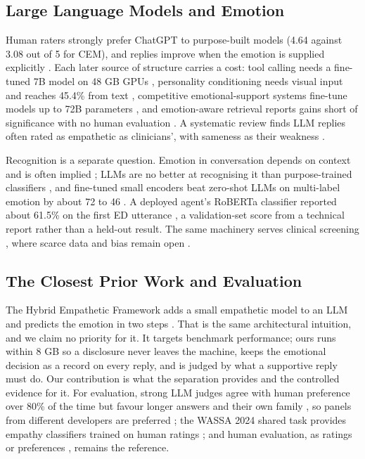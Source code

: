 \documentclass[conference]{IEEEtran}
\begin{document}
\subsection{Large Language Models and Emotion}
Human raters strongly prefer ChatGPT to purpose-built models (4.64 against 3.08 out of 5 for CEM), and replies improve when the emotion is supplied explicitly \cite{b11,b12}. Each later source of structure carries a cost: tool calling needs a fine-tuned 7B model on 48 GB GPUs \cite{b13}, personality conditioning needs visual input and reaches 45.4\% from text \cite{b14}, competitive emotional-support systems fine-tune models up to 72B parameters \cite{b24}, and emotion-aware retrieval reports gains short of significance with no human evaluation \cite{b25}. A systematic review finds LLM replies often rated as empathetic as clinicians', with sameness as their weakness \cite{b18}.

Recognition is a separate question. Emotion in conversation depends on context \cite{b26} and is often implied \cite{b27}; LLMs are no better at recognising it than purpose-trained classifiers \cite{b16}, and fine-tuned small encoders beat zero-shot LLMs on multi-label emotion by about 72 to 46 \cite{b17}. A deployed agent's RoBERTa classifier reported about 61.5\% on the first ED utterance \cite{b28}, a validation-set score from a technical report rather than a held-out result. The same machinery serves clinical screening \cite{b29,b30}, where scarce data and bias remain open \cite{b31}.

\subsection{The Closest Prior Work and Evaluation}
The Hybrid Empathetic Framework adds a small empathetic model to an LLM and predicts the emotion in two steps \cite{b19}. That is the same architectural intuition, and we claim no priority for it. It targets benchmark performance; ours runs within 8 GB so a disclosure never leaves the machine, keeps the emotional decision as a record on every reply, and is judged by what a supportive reply must do. Our contribution is what the separation provides and the controlled evidence for it. For evaluation, strong LLM judges agree with human preference over 80\% of the time but favour longer answers \cite{b32} and their own family \cite{b33}, so panels from different developers are preferred \cite{b34}; the WASSA 2024 shared task provides empathy classifiers trained on human ratings \cite{b35,b36}; and human evaluation, as ratings \cite{b11} or preferences \cite{b13}, remains the reference.
\end{document}
